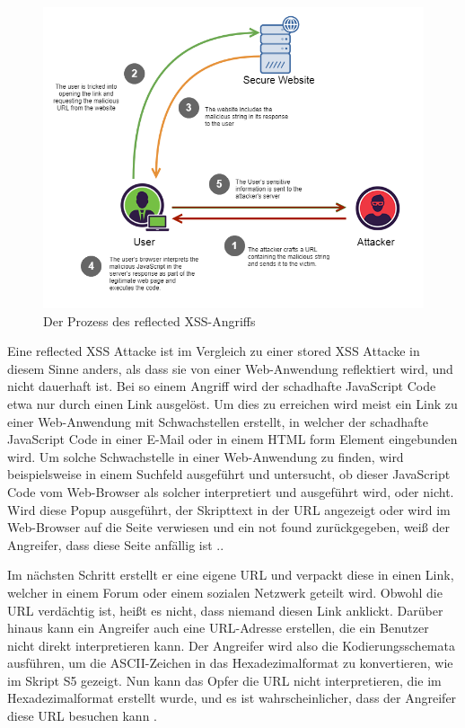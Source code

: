 \begin{figure}[ht]
	\centering
	\includegraphics[width=1\linewidth]{images/medium/2_reflected_xss.png}
	\caption[Der Prozess des reflected XSS-Angriffs]
	{Der Prozess des reflected XSS-Angriffs \textcite{makarem2018a}}
\end{figure}

Eine reflected XSS Attacke ist im Vergleich zu einer stored XSS Attacke in diesem Sinne anders, als dass sie von einer Web-Anwendung reflektiert wird, und nicht dauerhaft ist. Bei so einem Angriff wird der schadhafte JavaScript Code etwa nur durch einen Link ausgelöst.
Um dies zu erreichen wird meist ein Link zu einer Web-Anwendung mit Schwachstellen erstellt, in welcher der schadhafte JavaScript Code in einer E-Mail oder in einem HTML form Element eingebunden wird. Um solche Schwachstelle in einer Web-Anwendung zu finden, wird beispielsweise in einem Suchfeld ausgeführt und untersucht, ob dieser JavaScript Code vom Web-Browser als solcher interpretiert und ausgeführt wird, oder nicht.
Wird diese Popup ausgeführt, der Skripttext in der URL angezeigt oder wird im Web-Browser auf die Seite verwiesen und ein not found zurückgegeben, weiß der Angreifer, dass diese Seite anfällig ist \autocite[125]{gupta2015a}..

Im nächsten Schritt erstellt er eine eigene URL und verpackt diese in einen Link, welcher in einem Forum oder einem sozialen Netzwerk geteilt wird. Obwohl die URL verdächtig ist, heißt es nicht, dass niemand diesen Link anklickt. Darüber hinaus kann ein Angreifer auch eine URL-Adresse erstellen, die ein Benutzer nicht direkt interpretieren kann. Der Angreifer wird also die Kodierungsschemata ausführen, um die ASCII-Zeichen in das Hexadezimalformat zu konvertieren, wie im Skript S5 gezeigt. Nun kann das Opfer die URL nicht interpretieren, die im Hexadezimalformat erstellt wurde, und es ist wahrscheinlicher, dass der Angreifer diese URL besuchen kann \autocite[125]{gupta2015a}.


